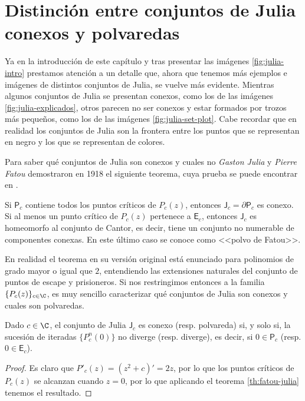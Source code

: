 \section{Distinción entre conjuntos de Julia conexos y polvaredas}
\label{section:conexos-polvaredas}

Ya en la introducción de este capítulo y tras presentar las imágenes \ref{fig:julia-intro} prestamos atención a un detalle que, ahora que tenemos más ejemplos e imágenes de distintos conjuntos de Julia, se vuelve más evidente. Mientras algunos conjuntos de Julia se presentan conexos, como los de las imágenes \ref{fig:julia-explicados}, otros parecen no ser conexos y estar formados por trozos más pequeños, como los de las imágenes \ref{fig:julia-set-plot}. Cabe recordar que en realidad los conjuntos de Julia son la frontera entre los puntos que se representan en negro y los que se representan de colores.

Para saber qué conjuntos de Julia son conexos y cuales no \textit{Gaston Julia} y \textit{Pierre Fatou} demostraron en 1918 el siguiente teorema, cuya prueba se puede encontrar en \cite[Theorem 9.5]{John-Milnor}.

\begin{teorema}
  \label{th:fatou-julia}
  Si $\mathsf{P}_c$ contiene todos los puntos críticos de $P_c(z)$, entonces $\mathsf{J}_c=\partial \mathsf{P}_c$ es conexo. Si al menos un punto crítico de $P_c(z)$ pertenece a $\mathsf{E}_c$, entonces $\mathsf{J}_c$ es homeomorfo al conjunto de Cantor, es decir, tiene un conjunto no numerable de componentes conexas. En este último caso se conoce como <<polvo de Fatou>>.
\end{teorema}

En realidad el teorema en su versión original está enunciado para polinomios de grado mayor o igual que $2$, entendiendo las extensiones naturales del conjunto de puntos de escape y prisioneros. Si nos restringimos entonces a la familia $\{P_c(z)\}_{c\in\C}$, es muy sencillo caracterizar qué conjuntos de Julia son conexos y cuales son polvaredas.

\begin{corolario}
  \label{th:conexo-polvareda}
  Dado $c\in\C$, el conjunto de Julia $\mathsf{J}_c$ es conexo (resp. polvareda) si, y solo si, la sucesión de iteradas $\{P_c^n(0)\}$ no diverge (resp. diverge), es decir, si $0\in\mathsf{P}_c$ (resp. $0\in\mathsf{E}_c$).
\end{corolario}
\begin{proof}
  Es claro que $P'_c(z)=(z^2+c)'=2z$, por lo que los puntos críticos de $P_c(z)$ se alcanzan cuando $z=0$, por lo que aplicando el teorema \ref{th:fatou-julia} tenemos el resultado.
\end{proof}


